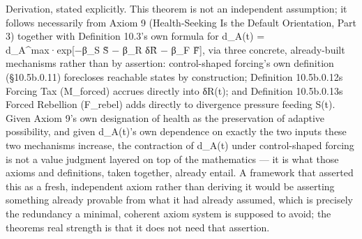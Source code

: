 \documentclass[
]{article}
\begin{document}
Derivation, stated explicitly. This theorem is not an independent
assumption; it follows necessarily from Axiom 9 (Health-Seeking Is the
Default Orientation, Part 3) together with Definition 10.3's own formula
for d\_A(t) = d\_A\^{}max·exp{[}−β\_S S̃ − β\_R δR̃ − β\_F F̃{]}, via three
concrete, already-built mechanisms rather than by assertion:
control-shaped forcing's own definition (§10.5b.0.11) forecloses
reachable states by construction; Definition 10.5b.0.12s Forcing Tax
(M\_forced) accrues directly into δR(t); and Definition 10.5b.0.13s
Forced Rebellion (F\_rebel) adds directly to divergence pressure feeding
S(t). Given Axiom 9's own designation of health as the preservation of
adaptive possibility, and given d\_A(t)'s own dependence on exactly the
two inputs these two mechanisms increase, the contraction of d\_A(t)
under control-shaped forcing is not a value judgment layered on top of
the mathematics --- it is what those axioms and definitions, taken
together, already entail. A framework that asserted this as a fresh,
independent axiom rather than deriving it would be asserting something
already provable from what it had already assumed, which is precisely
the redundancy a minimal, coherent axiom system is supposed to avoid;
the theorems real strength is that it does not need that assertion.
\end{document}
